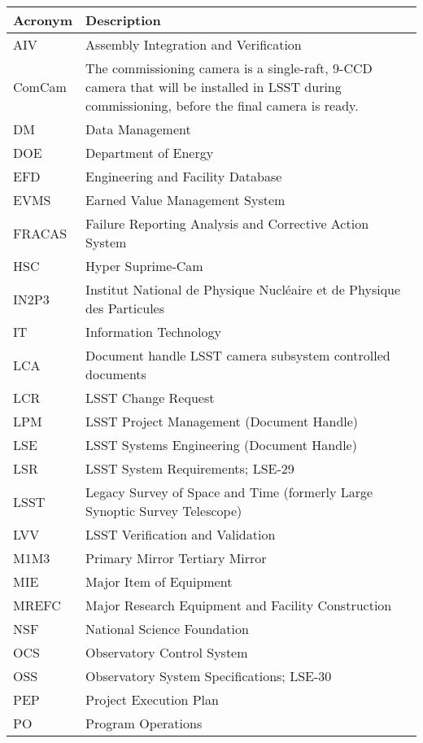 \addtocounter{table}{-1}
\begin{longtable}{p{}p{}}\hline
\textbf{Acronym} & \textbf{Description}  \\\hline

AIV & Assembly Integration and Verification \\\hline
ComCam & The commissioning camera is a single-raft, 9-CCD camera that will be installed in LSST during commissioning, before the final camera is ready. \\\hline
DM & Data Management \\\hline
DOE & Department of Energy \\\hline
EFD & Engineering and Facility Database \\\hline
EVMS & Earned Value Management System \\\hline
FRACAS & Failure Reporting Analysis and Corrective Action System \\\hline
HSC & Hyper Suprime-Cam \\\hline
IN2P3 & Institut National de Physique Nucléaire et de Physique des Particules \\\hline
IT & Information Technology \\\hline
LCA & Document handle LSST camera subsystem controlled documents \\\hline
LCR & LSST Change Request \\\hline
LPM & LSST Project Management (Document Handle) \\\hline
LSE & LSST Systems Engineering (Document Handle) \\\hline
LSR & LSST System Requirements; LSE-29 \\\hline
LSST & Legacy Survey of Space and Time (formerly Large Synoptic Survey Telescope) \\\hline
LVV & LSST Verification and Validation \\\hline
M1M3 & Primary Mirror Tertiary Mirror \\\hline
MIE & Major Item of Equipment \\\hline
MREFC & Major Research Equipment and Facility Construction \\\hline
NSF & National Science Foundation \\\hline
OCS & Observatory Control System \\\hline
OSS & Observatory System Specifications; LSE-30 \\\hline
PEP & Project Execution Plan \\\hline
PO & Program Operations \\\hline

\end{longtable}
